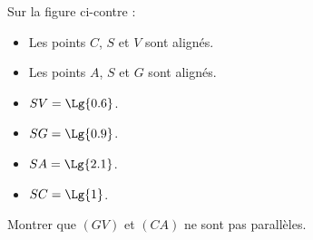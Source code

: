 \begin{exercice*}
    Sur la figure ci-contre :

    \begin{minipage}{0.65\linewidth}
        
        \begin{itemize}
            \item Les points $C$, $S$ et $V$ sont alignés.
            \item Les points $A$, $S$ et $G$ sont alignés.            
            \item $SV=\Lg{0.6}$.
            \item $SG=\Lg{0.9}$.
            \item $SA=\Lg{2.1}$.
            \item $SC=\Lg{1}$.
        \end{itemize}
    \end{minipage}
    \begin{minipage}{0.35\linewidth}
        \hspace*{-15mm}        
    \end{minipage}

    Montrer que $(GV)$ et $(CA)$ ne sont pas parallèles.

\end{exercice*}
\begin{corrige}
    \phantom{rrr}

    
\end{corrige}

